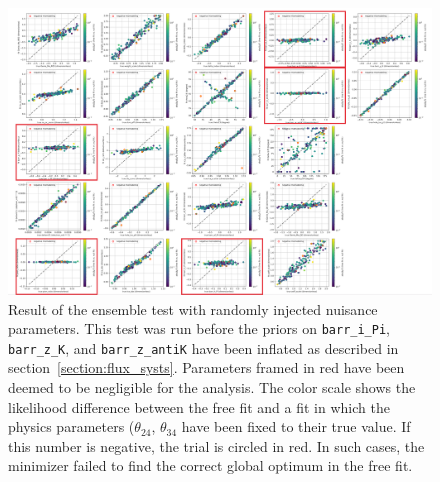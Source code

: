 \begin{figure}
    \centering
    \includegraphics{figures/measurement/sterile_analysis/param_selection/Screen Shot 2022-05-30 at 13.12.49.png}
    \caption{Result of the ensemble test with randomly injected nuisance parameters. This test was run before the priors on \texttt{barr\_i\_Pi}, \texttt{barr\_z\_K}, and \texttt{barr\_z\_antiK} have been inflated as described in section~\ref{section:flux_systs}. Parameters framed in red have been deemed to be negligible for the analysis. The color scale shows the likelihood difference between the free fit and a fit in which the physics parameters ($\theta_{24}$, $\theta_{34}$ have been fixed to their true value. If this number is negative, the trial is circled in red. In such cases, the minimizer failed to find the correct global optimum in the free fit.}
    \label{fig:parameter-ensemble-result}
\end{figure}

